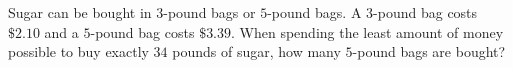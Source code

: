 Sugar can be bought in $3$-pound bags or $5$-pound bags. A $3$-pound bag costs $\$2.10$ and a $5$-pound bag costs $\$3.39$. When spending the least amount of money possible to buy exactly $34$ pounds of sugar, how many $5$-pound bags are bought?
